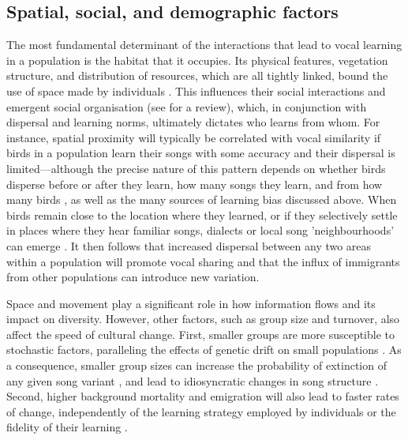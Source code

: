 \subsection{Spatial, social, and demographic factors}
The most fundamental determinant of the interactions that lead to vocal learning in a population is the habitat that it occupies. Its physical features, vegetation structure, and distribution of resources, which are all tightly linked, bound the use of space made by individuals \autocite{spiegel2016, albery2021, firth2016}. This influences their social interactions and emergent social organisation (see \cite{he2019} for a review), which, in conjunction with dispersal and learning norms, ultimately dictates who learns from whom. For instance, spatial proximity will typically be correlated with vocal similarity if birds in a population learn their songs with some accuracy and their dispersal is limited---although the precise nature of this pattern depends on whether birds disperse before or after they learn, how many songs they learn, and from how many birds \autocite{ellers2003,williams1990}, as well as the many sources of learning bias discussed above. When birds remain close to the location where they learned, or if they selectively settle in places where they hear familiar songs, dialects or local song 'neighbourhoods' can emerge \autocite{podos2007}. It then follows that increased dispersal between any two areas within a population will promote vocal sharing and that the influx of immigrants from other populations can introduce new variation.

Space and movement play a significant role in how information flows and its impact on diversity. However, other factors, such as group size and turnover, also affect the speed of cultural change. First, smaller groups are more susceptible to stochastic factors, paralleling the effects of genetic drift on small populations \autocite{kimura1964}. As a consequence, smaller group sizes can increase the probability of extinction of any given song variant \autocite{nunn2009}, and lead to idiosyncratic changes in song structure \autocite{lachlan2013}. Second, higher background mortality and emigration will also lead to faster rates of change, independently of the learning strategy employed by individuals or the fidelity of their learning \autocite{nunn2009,Slater1986}.


